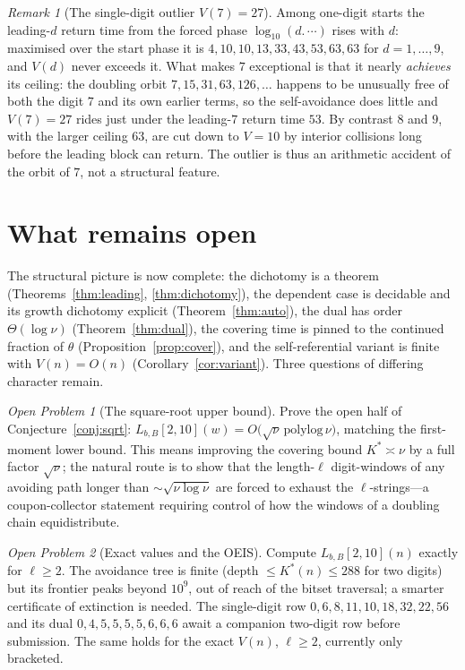 \documentclass[11pt]{article}
\theoremstyle{plain}
\theoremstyle{definition}
\theoremstyle{remark}
\newtheorem{remark}{Remark}
\newtheorem{question}{Open Problem}
\newcommand{\Lbb}{L_{b,B}}
\begin{document}
\begin{remark}[The single-digit outlier $V(7)=27$]
Among one-digit starts the leading-$d$ return time from the forced phase $\log_{10}(d{.}\,\cdots)$ rises with $d$: maximised over the start phase it is $4,10,10,13,33,43,53,63,63$ for $d=1,\dots,9$, and $V(d)$ never exceeds it. What makes $7$ exceptional is that it nearly \emph{achieves} its ceiling: the doubling orbit $7,15,31,63,126,\dots$ happens to be unusually free of both the digit $7$ and its own earlier terms, so the self-avoidance does little and $V(7)=27$ rides just under the leading-$7$ return time $53$. By contrast $8$ and $9$, with the larger ceiling $63$, are cut down to $V=10$ by interior collisions long before the leading block can return. The outlier is thus an arithmetic accident of the orbit of $7$, not a structural feature.
\end{remark}

\section{What remains open}

The structural picture is now complete: the dichotomy is a theorem (Theorems~\ref{thm:leading}, \ref{thm:dichotomy}), the dependent case is decidable and its growth dichotomy explicit (Theorem~\ref{thm:auto}), the dual has order $\Theta(\log\nu)$ (Theorem~\ref{thm:dual}), the covering time is pinned to the continued fraction of $\theta$ (Proposition~\ref{prop:cover}), and the self-referential variant is finite with $V(n)=O(n)$ (Corollary~\ref{cor:variant}). Three questions of differing character remain.

\begin{question}[The square-root upper bound]
Prove the open half of Conjecture~\ref{conj:sqrt}: $\Lbb[2,10](w)=O\!\bigl(\sqrt\nu\,\mathrm{polylog}\,\nu\bigr)$, matching the first-moment lower bound. This means improving the covering bound $K^{*}\asymp\nu$ by a full factor $\sqrt\nu$; the natural route is to show that the length-$\ell$ digit-windows of any avoiding path longer than $\sim\sqrt{\nu\log\nu}$ are forced to exhaust the $\ell$-strings---a coupon-collector statement requiring control of how the windows of a doubling chain equidistribute.
\end{question}

\begin{question}[Exact values and the OEIS]
Compute $\Lbb[2,10](n)$ exactly for $\ell\ge2$. The avoidance tree is finite (depth $\le K^{*}(n)\le 288$ for two digits) but its frontier peaks beyond $10^{9}$, out of reach of the bitset traversal; a smarter certificate of extinction is needed. The single-digit row $0,6,8,11,10,18,32,22,56$ and its dual $0,4,5,5,5,5,6,6,6$ await a companion two-digit row before submission. The same holds for the exact $V(n)$, $\ell\ge2$, currently only bracketed.
\end{question}
\end{document}
